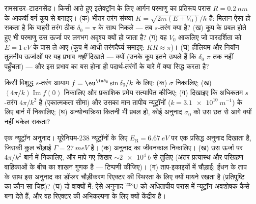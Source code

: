 \begin{exercise}[$\star\star$]\label{exo:b3:scattering-theory:8}
रामसाउर--टाउनसेंड। किसी आते हुए इलेक्ट्रॉन के लिए आर्गन परमाणु का
प्रतिरूप परास $R =
\qty{0.2}{nm}$ के आकर्षी वर्ग कूप से बनाइए। (क) भीतर तरंग संख्या $K =
\sqrt{2m(E + V_0)}/\hbar$ है: मिलान ऐसा हो सकता है कि बाहरी तरंग ठीक
$\delta_0 = \pi$ के साथ निकले --- तब $s$-तरंग
 क्या है? (ख) कूप के प्रबल होते हुए भी परमाणु उस ऊर्जा
पर लगभग अदृश्य क्यों हो जाता है? (ग) वह $V_0$ आकलिए
जो पारदर्शिता को $E = \qty{1}{eV}$ के पास ले आए (कूप में आधी
तरंगदैर्घ्य समाइए: $KR \approx \pi$)। (घ) हीलियम और
नियॉन तुलनीय ऊर्जाओं पर यह प्रभाव \emph{नहीं} दिखाते --- क्यों (उनके
कूप इतने उथले हैं कि $\delta_0$ $\pi$ तक नहीं पहुँचता) --- और इस
प्रभाव का बस होना ही पदार्थ-तरंगों के बारे में क्या सिद्ध करता है?
\end{exercise}

\begin{exercise}[$\star\star$]\label{exo:b3:scattering-theory:9}
किसी विशुद्ध $s$-तरंग आयाम $f = \eu^{\iu\delta_0}\sin\delta_0/
k$ के लिए: (क) $\sigma$ निकालिए; (ख) $(4\pi/k)\operatorname{Im}
f(0)$ निकालिए और प्रकाशिक प्रमेय सत्यापित कीजिए; (ग) दिखाइए कि अधिकतम
$s$-तरंग  $4\pi/k^2$ है (एकात्मकता सीमा) और
उसका मान तापीय न्यूट्रॉनों ($k = \qty{3.1e10}{m^{-1}}$) के लिए
बार्न में निकालिए; (घ) अन्योन्यक्रिया कितनी भी प्रबल हो, कोई अनुनाद
$\sigma_0$ को उस छत से आगे क्यों नहीं धकेल सकता?
\end{exercise}

\begin{exercise}[$\star\star\star$]\label{exo:b3:scattering-theory:10}
एक न्यूट्रॉन अनुनाद। यूरेनियम-238 न्यूट्रॉनों के लिए
$E_{\text{R}} = \qty{6.67}{eV}$ पर एक प्रसिद्ध अनुनाद दिखाता है,
जिसकी कुल चौड़ाई $\Gamma = \qty{27}{meV}$ है। (क) अनुनाद का जीवनकाल
निकालिए। (ख) उस ऊर्जा पर $4\pi/k^2$ बार्न में निकालिए, और मापे गए
शिखर $\sim\qty{2e4}{b}$ से तुलिए (अंतर प्रत्यास्थ और परिग्रहण
वाहिकाओं के बीच का शाखन गुणक है --- टिप्पणी कीजिए)। (ग) ताप-इकाइयों
में चौड़ाई: ईंधन के ताप के साथ इस अनुनाद का डॉप्लर चौड़ीकरण रिएक्टर
की स्थिरता के लिए क्यों मायने रखता है (प्रतिपुष्टि का कौन-सा चिह्न)?
(घ) दो वाक्यों में: ऐसे अनुनाद $^{238}$U को अधितापीय परास में
न्यूट्रॉन-अवशोषक कैसे बना देते हैं, और वह रिएक्टर की अभिकल्पना के लिए
क्यों केंद्रीय है।
\end{exercise}

